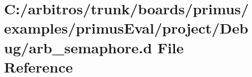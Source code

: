 \hypertarget{boards_2primus_2examples_2primus_eval_2project_2_debug_2arb__semaphore_8d}{\section{C\-:/arbitros/trunk/boards/primus/examples/primus\-Eval/project/\-Debug/arb\-\_\-semaphore.d File Reference}
\label{boards_2primus_2examples_2primus_eval_2project_2_debug_2arb__semaphore_8d}
}

